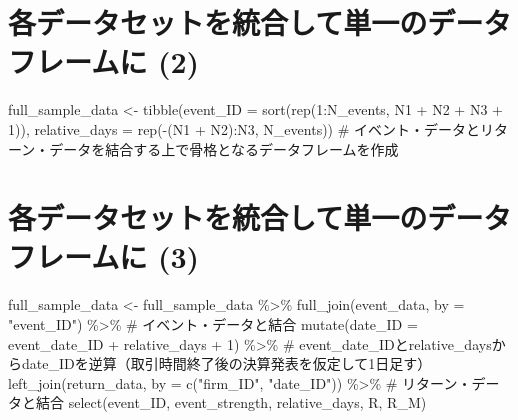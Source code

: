 \documentclass[
  letterpaper,
  DIV=11,
  numbers=noendperiod]{scrreprt}
\newenvironment{Shaded}{\begin{snugshade}}{\end{snugshade}}
\newcommand{\AttributeTok}[1]{\textcolor[rgb]{0.40,0.45,0.13}{#1}}
\newcommand{\CommentTok}[1]{\textcolor[rgb]{0.37,0.37,0.37}{#1}}
\newcommand{\DecValTok}[1]{\textcolor[rgb]{0.68,0.00,0.00}{#1}}
\newcommand{\FunctionTok}[1]{\textcolor[rgb]{0.28,0.35,0.67}{#1}}
\newcommand{\NormalTok}[1]{\textcolor[rgb]{0.00,0.23,0.31}{#1}}
\newcommand{\OtherTok}[1]{\textcolor[rgb]{0.00,0.23,0.31}{#1}}
\newcommand{\SpecialCharTok}[1]{\textcolor[rgb]{0.37,0.37,0.37}{#1}}
\newcommand{\StringTok}[1]{\textcolor[rgb]{0.13,0.47,0.30}{#1}}
\begin{document}
\section{各データセットを統合して単一のデータフレームに
(2)}\label{ux5404ux30c7ux30fcux30bfux30bbux30c3ux30c8ux3092ux7d71ux5408ux3057ux3066ux5358ux4e00ux306eux30c7ux30fcux30bfux30d5ux30ecux30fcux30e0ux306b-2}

\begin{Shaded}
\begin{Highlighting}[]
\NormalTok{full\_sample\_data }\OtherTok{\textless{}{-}} \FunctionTok{tibble}\NormalTok{(}\AttributeTok{event\_ID =} \FunctionTok{sort}\NormalTok{(}\FunctionTok{rep}\NormalTok{(}\DecValTok{1}\SpecialCharTok{:}\NormalTok{N\_events, N1 }\SpecialCharTok{+}\NormalTok{ N2 }\SpecialCharTok{+}\NormalTok{ N3 }\SpecialCharTok{+} \DecValTok{1}\NormalTok{)),}
                                \AttributeTok{relative\_days =} \FunctionTok{rep}\NormalTok{(}\SpecialCharTok{{-}}\NormalTok{(N1 }\SpecialCharTok{+}\NormalTok{ N2)}\SpecialCharTok{:}\NormalTok{N3, N\_events)) }\CommentTok{\# イベント・データとリターン・データを結合する上で骨格となるデータフレームを作成}
\end{Highlighting}
\end{Shaded}

\section{各データセットを統合して単一のデータフレームに
(3)}\label{ux5404ux30c7ux30fcux30bfux30bbux30c3ux30c8ux3092ux7d71ux5408ux3057ux3066ux5358ux4e00ux306eux30c7ux30fcux30bfux30d5ux30ecux30fcux30e0ux306b-3}

\begin{Shaded}
\begin{Highlighting}[]
\NormalTok{full\_sample\_data }\OtherTok{\textless{}{-}}\NormalTok{ full\_sample\_data }\SpecialCharTok{\%\textgreater{}\%} 
  \FunctionTok{full\_join}\NormalTok{(event\_data, }\AttributeTok{by =} \StringTok{"event\_ID"}\NormalTok{) }\SpecialCharTok{\%\textgreater{}\%} \CommentTok{\# イベント・データと結合}
  \FunctionTok{mutate}\NormalTok{(}\AttributeTok{date\_ID =}\NormalTok{ event\_date\_ID }\SpecialCharTok{+}\NormalTok{ relative\_days }\SpecialCharTok{+} \DecValTok{1}\NormalTok{) }\SpecialCharTok{\%\textgreater{}\%} \CommentTok{\# event\_date\_IDとrelative\_daysからdate\_IDを逆算（取引時間終了後の決算発表を仮定して1日足す）}
  \FunctionTok{left\_join}\NormalTok{(return\_data, }\AttributeTok{by =} \FunctionTok{c}\NormalTok{(}\StringTok{"firm\_ID"}\NormalTok{, }\StringTok{"date\_ID"}\NormalTok{)) }\SpecialCharTok{\%\textgreater{}\%} \CommentTok{\# リターン・データと結合}
  \FunctionTok{select}\NormalTok{(event\_ID, event\_strength, relative\_days, R, R\_M)}
\end{Highlighting}
\end{Shaded}
\end{document}
